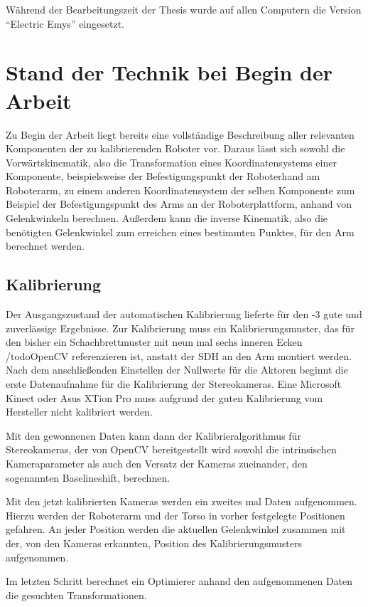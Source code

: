 Während der Bearbeitungszeit der Thesis wurde auf allen Computern die Version
``Electric Emys'' eingesetzt.

\section{Stand der Technik bei Begin der Arbeit}

Zu Begin der Arbeit liegt bereits eine vollständige Beschreibung aller
relevanten Komponenten der zu kalibrierenden Roboter vor. Daraus lässt sich
sowohl die Vorwärtskinematik, also die Transformation eines Koordinatensystems
einer Komponente, beispielsweise der Befestigungspunkt der Roboterhand am
Roboterarm, zu einem anderen Koordinatensystem der selben Komponente zum
Beispiel der Befestigungspunkt des Arms an der Roboterplattform, anhand von
Gelenkwinkeln berechnen. Außerdem kann die inverse Kinematik, also die
benötigten Gelenkwinkel zum erreichen eines bestimmten Punktes, für den Arm
berechnet werden.


\subsection{Kalibrierung}

Der Ausgangszustand der automatischen Kalibrierung lieferte für den 
-3 gute und zuverlässige Ergebnisse. Zur Kalibrierung muss ein
Kalibrierungsmuster, das für den \cob bisher ein Schachbrettmuster mit neun mal
sechs inneren Ecken /todo{OpenCV referenzieren} ist, anstatt der
\ac{SDH} an den Arm montiert werden. Nach dem anschließenden Einstellen der
Nullwerte für die Aktoren beginnt die erste Datenaufnahme für die Kalibrierung
der Stereokameras. Eine Microsoft Kinect oder Asus XTion Pro muss aufgrund der
guten Kalibrierung vom Hersteller nicht kalibriert werden. 

Mit den gewonnenen Daten kann dann der Kalibrieralgorithmus für Stereokameras,
der von OpenCV bereitgestellt wird sowohl die intrinsischen Kameraparameter als
auch den Versatz der Kameras zueinander, den sogenannten Baselineshift,
berechnen.

Mit den jetzt kalibrierten Kameras werden ein zweites mal Daten aufgenommen.
Hierzu werden der Roboterarm und der Torso in vorher festgelegte Positionen
gefahren. An jeder Position werden die aktuellen Gelenkwinkel zusammen mit der,
von den Kameras erkannten, Position des Kalibrierungsmusters aufgenommen.

Im letzten Schritt berechnet ein Optimierer anhand den aufgenommenen Daten die
gesuchten Transformationen.

